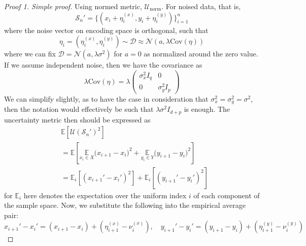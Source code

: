\begin{proof}[Proof 1. Simple proof]
    Using normed metric, $\mathcal{U}_{\mathrm{norm}}$. For noised data, that is, \begin{equation}
        \mathcal{S}_{n}' = \{(x_{i}+\eta^{(x)}_{i}, y_{i}+\eta^{(y)}_{i})\}^{n}_{i=1}
    \end{equation}
    where the noise vector on encoding space is orthogonal, such that \begin{equation}
        \eta_{i}=(\eta_{i}^{(x)},\eta_{i}^{(y)})\sim\mathcal{D}\approx \mathcal{N}\left(a,\lambda\mathrm{Cov}(\eta)\right)
    \end{equation}
    where we can fix $\mathcal{D}=\mathcal{N}(a,\lambda\sigma^{2})$ for $a=0$ as normalized around the zero value. If we assume independent noise, then we have the covariance as 
    \begin{equation}
        \lambda \mathrm{Cov}(\eta)= \lambda\begin{pmatrix}
            \sigma_x^2 I_q & 0 \\
            0 & \sigma_y^2 I_p
        \end{pmatrix}
    \end{equation}
    We can simplify slightly, as to have the case in consideration that $\sigma^{2}_{x}=\sigma^{2}_{y}=\sigma^{2}$, then the notation would effectively be such that $\lambda\sigma^{2}I_{d+p}$ is enough. The uncertainty metric then should be expressed as 
    \begin{equation}
        \begin{split}
            &\mathbb{E}[\mathcal{U}(\mathcal{S}_{n}')^{2} ] \\
            &= \mathbb{E}\left[\underset{x_{i}\in X}{\mathbb{E}}\Big( x_{i+1} - x_{i} \Big)^{2} + \underset{y_{i}\in Y}{\mathbb{E}} \Big( y_{i+1}- y_{i} \Big)^{2}\right]\\
            & = \mathbb{E}_{i}\left[ (x_{i+1}'-x_{i}')^{2} \right] + \mathbb{E}_{i}\left[ (y_{i+1}'-y_{i}')^{2} \right]
        \end{split}
    \end{equation}
    for $\mathbb{E}_{i}$ here denotes the expectation over the uniform index $i$ of each component of the sample space. Now, we substitute the following into the empirical average pair:
    \begin{equation}
        x_{i+1}'- x_{i}' = (x_{i+1}- x_{i}) + (\eta_{i+1}^{(x)}- \nu_{i}^{(x)}), \quad y_{i+1}'- y_{i}' = (y_{i+1}- y_{i}) + (\eta_{i+1}^{(y)}- \nu_{i}^{(y)})
    \end{equation}

\end{proof}
